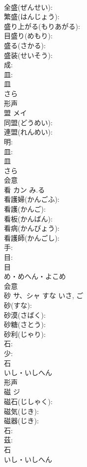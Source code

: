 \documentclass[8pt]{extreport}
\begin{document}
\begin{CJK}{UTF8}{min}
\\	全盛(ぜんせい): 
\\	繁盛(はんじょう): 
\\	盛り上がる(もりあがる): 
\\	目盛り(めもり): 
\\	盛る(さかる): 
\\	盛装(せいそう): 
\\	成: 
\\	皿: 
\\	皿	
\\	さら	
\\	形声 
\\	盟	メイ			
\\	同盟(どうめい): 
\\	連盟(れんめい): 
\\	明: 
\\	皿: 
\\	皿	
\\	さら	
\\	会意 
\\	看	カン	み.る		
\\	看護婦(かんごふ): 
\\	看護(かんご): 
\\	看板(かんばん): 
\\	看病(かんびょう): 
\\	看護師(かんごし): 
\\	手: 
\\	目: 
\\	目	
\\	め・めへん・よこめ	
\\	会意 
\\	砂	サ、シャ	すな	いさ, ご	
\\	砂(すな): 
\\	砂漠(さばく): 
\\	砂糖(さとう): 
\\	砂利(じゃり): 
\\	石: 
\\	少: 
\\	石	
\\	いし・いしへん	
\\	形声 
\\	磁	ジ			
\\	磁石(じしゃく): 
\\	磁気(じき): 
\\	磁器(じき): 
\\	石: 
\\	茲: 
\\	石	
\\	いし・いしへん	

\end{CJK}
\end{document}
